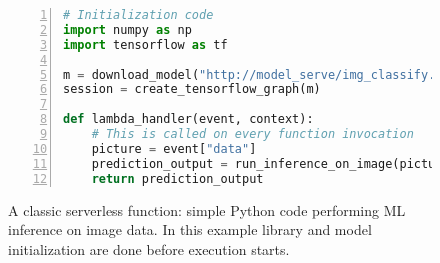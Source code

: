 \begin{figure}
  \begin{lstlisting}[language=python, numbers=left, frame=single, basicstyle=\footnotesize\sffamily, columns=fullflexible, label={lst:python-lambda-example}]
# Initialization code 
import numpy as np 
import tensorflow as tf
  
m = download_model("http://model_serve/img_classify.pb")
session = create_tensorflow_graph(m) 
  
def lambda_handler(event, context):
    # This is called on every function invocation 
    picture = event["data"]
    prediction_output = run_inference_on_image(picture) 
    return prediction_output 
\end{lstlisting}
     \caption{A classic serverless function: simple Python code performing ML inference on image data. 
              In this example library and model initialization are done before execution starts.}
     \label{fig:python-lambda-example}
\end{figure}

